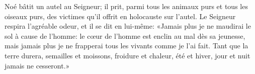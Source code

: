Noé bâtit un autel au Seigneur;
	il prit, parmi tous les animaux purs et tous les oiseaux purs,
	des victimes qu’il offrit en holocauste sur l’autel.
Le Seigneur respira l’agréable odeur, et il se dit en lui-même:
	«Jamais plus je ne maudirai le sol à cause de l’homme:
	le cœur de l’homme est enclin au mal dès sa jeunesse,
	mais jamais plus je ne frapperai tous les vivants comme je l’ai fait.
Tant que la terre durera,
	semailles et moissons, froidure et chaleur,
	été et hiver, jour et nuit jamais ne cesseront.»
